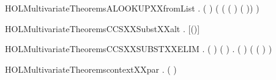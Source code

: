\begin{SaveVerbatim}{HOLMultivariateTheoremsALOOKUPXXfromList}
\HOLTokenTurnstile{} \HOLSymConst{\HOLTokenForall{}}  .
         \HOLSymConst{\HOLTokenConj{}} (  \HOLSymConst{=}  ) \HOLSymConst{\HOLTokenConj{}}  \HOLSymConst{\HOLTokenLt{}}   \HOLSymConst{\HOLTokenImp{}}
       ( ( ( \HOLSymConst{\HOLTokenMapto{}} ) (  )) \HOLSymConst{=}   )
\end{SaveVerbatim}
\newcommand{\HOLMultivariateTheoremsALOOKUPXXfromList}{\UseVerbatim{HOLMultivariateTheoremsALOOKUPXXfromList}}
\begin{SaveVerbatim}{HOLMultivariateTheoremsCCSXXSubstXXalt}
\HOLTokenTurnstile{} \HOLSymConst{\HOLTokenForall{}}  .     \HOLSymConst{=}   [(\HOLSymConst{,})]
\end{SaveVerbatim}
\newcommand{\HOLMultivariateTheoremsCCSXXSubstXXalt}{\UseVerbatim{HOLMultivariateTheoremsCCSXXSubstXXalt}}
\begin{SaveVerbatim}{HOLMultivariateTheoremsCCSXXSUBSTXXELIM}
\HOLTokenTurnstile{} \HOLSymConst{\HOLTokenForall{}} .
        ( ) ( ) \HOLSymConst{\HOLTokenImp{}}
       \HOLSymConst{\HOLTokenForall{}}.
           (  \HOLSymConst{=}  ) \HOLSymConst{\HOLTokenImp{}} (  ( \HOLSymConst{\HOLTokenMapto{}} ) \HOLSymConst{=} )
\end{SaveVerbatim}
\newcommand{\HOLMultivariateTheoremsCCSXXSUBSTXXELIM}{\UseVerbatim{HOLMultivariateTheoremsCCSXXSUBSTXXELIM}}
\begin{SaveVerbatim}{HOLMultivariateTheoremscontextXXpar}
\HOLTokenTurnstile{} \HOLSymConst{\HOLTokenForall{}}  .
         ( \HOLSymConst{\ensuremath{\parallel}} ) \HOLSymConst{\HOLTokenImp{}}    \HOLSymConst{\HOLTokenConj{}}   
\end{SaveVerbatim}
